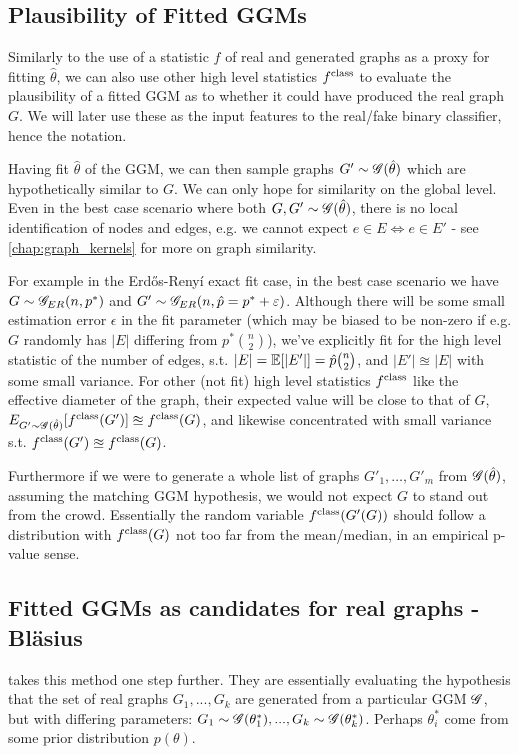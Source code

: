 \subsection{Plausibility of Fitted GGMs}

Similarly to the use of a statistic $f$ of real and generated graphs as a proxy for fitting $\hat{\theta}$, we can also use other high level statistics $f^{\mathrm{class}}$ to evaluate the plausibility of a fitted GGM as to whether it could have produced the real graph $G$. We will later use these as the input features to the real/fake binary classifier, hence the notation.

Having fit $\hat{\theta}$ of the GGM, we can then sample graphs $G' \sim \mathscr{G}(\hat{\theta})$ which are hypothetically similar to $G$. We can only hope for similarity on the global level. Even in the best case scenario where both $G, G' \sim \mathscr{G}(\hat{\theta})$, there is no local identification of nodes and edges, e.g. we cannot expect  $e \in E \iff e \in E'$ - see \cref{chap:graph_kernels} for more on graph similarity.

For example in the Erd\H{o}s-Reny{\'i} exact fit case, in the best case scenario we have $G \sim \mathscr{G}_{ER}(n, p^*)$ and $G' \sim \mathscr{G}_{ER}(n, \hat{p} = p^* + \varepsilon)$. Although there will be some small estimation error $\epsilon$ in the fit parameter (which may be biased to be non-zero if e.g. $G$ randomly has $|E|$ differing from $p^* {n \choose 2}$), we've explicitly fit for the high level statistic of the number of edges, s.t. $|E| = \mathbb{E}[|E'|] = \hat{p} \binom{n}{2}$, and $|E'| \approxeq |E|$ with some small variance. For other (not fit) high level statistics $f^{\mathrm{class}}$ like the effective diameter of the graph, their expected value will be close to that of $G$, $E_{G' \sim \mathscr{G}(\hat{\theta})}[f^{\mathrm{class}}(G')] \approxeq f^{\mathrm{class}}(G)$, and likewise concentrated with small variance s.t. $f^{\mathrm{class}}(G') \approxeq f^{\mathrm{class}}(G)$.


Furthermore if we were to generate a whole list of graphs $G'_1, \dots, G'_m$ from $\mathscr{G}(\hat{\theta})$, assuming the matching GGM hypothesis, we would not expect $G$ to stand out from the crowd. Essentially the random variable $f^{\mathrm{class}}(G'(G))$ should follow a distribution with $f^{\mathrm{class}}(G)$ not too far from the mean/median, in an empirical p-value sense.


\subsection{Fitted GGMs as candidates for real graphs - Bl{\"a}sius}
\label{sec:ggm_blasius_framework}
\cite{blasius2018towards} takes this method one step further. They are essentially evaluating the hypothesis that the set of real graphs $G_1, ..., G_k$ are generated from a particular GGM $\mathscr{G}$, but with differing parameters: $G_1 \sim \mathscr{G}(\theta^*_1), ..., G_k \sim \mathscr{G}(\theta^*_k)$. Perhaps $\theta^*_i$ come from some prior distribution $p(\theta)$.


